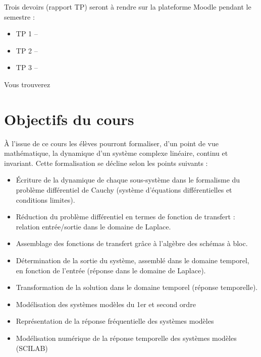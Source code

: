 \documentclass[a4paper,11pt]{article}
\begin{document}
Trois devoirs (rapport TP) seront à rendre sur la plateforme Moodle pendant le semestre :
\begin{itemize}
    \item TP 1 --
    \item TP 2 -- 
    \item TP 3 -- 
\end{itemize}

Vous trouverez 

\clearpage
\section*{Objectifs du cours}

À  l'issue  de  ce  cours  les  élèves  pourront  formaliser,  d'un  point  de  vue  mathématique,  
la dynamique d'un système complexe linéaire, continu et invariant. Cette formalisation se décline selon 
les points suivants :  

\begin{itemize}
    \item \'Ecriture  de  la  dynamique  de  chaque  sous-système  dans  le  formalisme  du  
          problème différentiel de Cauchy (système d'équations différentielles et conditions limites).
    \item Réduction du problème différentiel en termes de fonction de transfert : relation entrée/sortie 
          dans le domaine de Laplace.
    \item Assemblage des fonctions de transfert grâce à l'algèbre des schémas à bloc. 
    \item Détermination de la sortie du système, assemblé dans le domaine temporel, en fonction 
          de l'entrée (réponse dans le domaine de Laplace).
    \item Transformation de la solution dans le domaine temporel (réponse temporelle).
    \item Modélisation des systèmes modèles du 1er et second ordre 
    \item Représentation de la réponse fréquentielle des systèmes modèles
    \item Modélisation numérique de la réponse temporelle des systèmes modèles (SCILAB)
\end{itemize}
\end{document}
